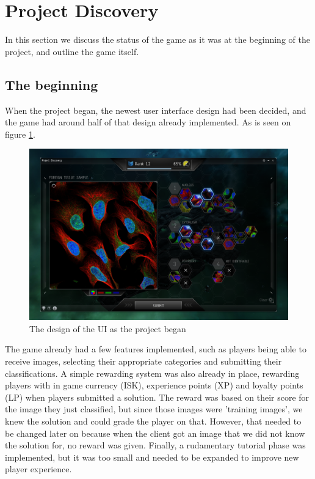\section{Project Discovery}\label{sec:project_discovery}
In this section we discuss the status of the game as it was at the beginning of the project, and outline the game itself.\\

\subsection{The beginning}
When the project began, the newest user interface design had been decided, and the game had around half of that design already implemented. As is seen on figure \ref{fig:PD}.

\begin{figure}[H]
	\centering
	\graphicspath{ {./graphics/} }
    \centerline{\includegraphics[scale=0.35]{PD.png}}
    \caption{\label{fig:PD}The design of the UI as the project began}
\end{figure}
\clearpage

The game already had a few features implemented, such as players being able to receive images, selecting their appropriate categories and submitting their classifications. A simple rewarding system was also already in place, rewarding players with in game currency (ISK), experience points (XP) and loyalty points (LP) when players submitted a solution. The reward was based on their score for the image they just classified, but since those images were 'training images', we knew the solution and could grade the player on that. However, that needed to be changed later on because when the client got an image that we did not know the solution for, no reward was given. Finally, a rudamentary tutorial phase was implemented, but it was too small and needed to be expanded to improve new player experience.\\

